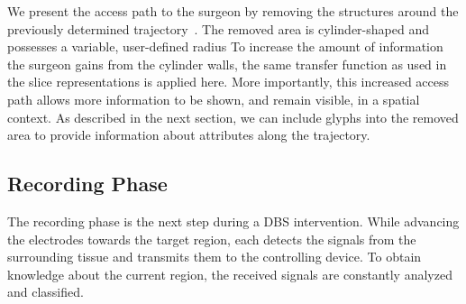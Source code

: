 \documentclass[review]{vgtc}                 %
\begin{document}
We present the access path to the surgeon by removing the structures around the previously determined trajectory~\cite{Weiskopf2002,Rieder2008}. The removed area is cylinder-shaped and possesses a variable, user-defined radius
To increase the amount of information the surgeon gains from the cylinder walls, the same transfer function as used in the slice representations is applied here. More importantly, this increased access path allows more information to be shown, and remain visible, in a spatial context. As described in the next section, we can include glyphs into the removed area to provide information about attributes along the trajectory.
%

\subsection{Recording Phase}\label{sec:overview:recording}
The recording phase is the next step during a DBS intervention. While advancing the electrodes towards the target region, each detects the signals from the surrounding tissue and transmits them to the controlling device. To obtain knowledge about the current region, the received signals are constantly analyzed and classified.
\end{document}
